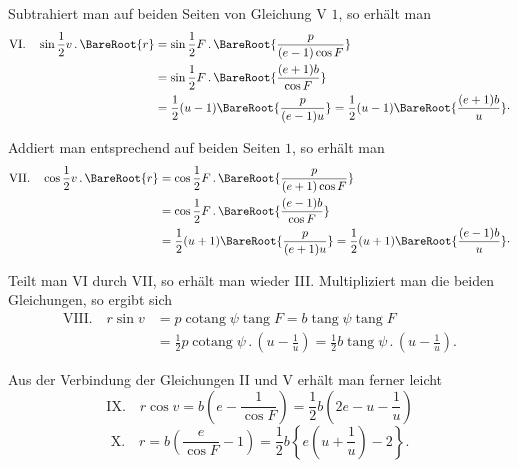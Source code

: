 Subtrahiert man auf beiden Seiten von Gleichung V $1$, so erhält man
\[
\begin{aligned}
\mathrm{VI.}\quad\sin\frac{1}{2}v\, .\,\BareRoot{r}&=\sin\frac{1}{2}F\, .\,\BareRoot{\frac{p}{(e-1)\cos F}}\\
&=\sin\frac{1}{2}F\, .\,\BareRoot{\frac{(e+1)b}{\cos F}}\\
&=\frac{1}{2}(u-1)\BareRoot{\frac{p}{(e-1)u}}=\frac{1}{2}(u-1)\BareRoot{\frac{(e+1)b}{u}}\cdot
\end{aligned}
\]

Addiert man entsprechend auf beiden Seiten $1$, so erhält man
\[
\begin{aligned}
\mathrm{VII.}\quad\cos\frac{1}{2}v\, .\,\BareRoot{r}&=\cos\frac{1}{2}F\, .\,\BareRoot{\frac{p}{(e+1)\cos F}}\\
&=\cos\frac{1}{2}F\, .\,\BareRoot{\frac{(e-1)b}{\cos F}}\\
&=\frac{1}{2}(u+1)\BareRoot{\frac{p}{(e+1)u}}=\frac{1}{2}(u+1)\BareRoot{\frac{(e-1)b}{u}}\cdot
\end{aligned}
\]

Teilt man VI durch VII, so erhält man wieder III. Multipliziert man die beiden Gleichungen, so ergibt sich
\[
\begin{aligned}
\mathrm{VIII.}\quad r\sin v&=p\operatorname{cotang}\psi\operatorname{tang}F=b\operatorname{tang}\psi\operatorname{tang}F\\
&=\frac{1}{2}p\operatorname{cotang}\psi\, .\,\left(u-\frac{1}{u}\right)=\frac{1}{2}b\operatorname{tang}\psi\, .\,\left(u-\frac{1}{u}\right).
\end{aligned}
\]

Aus der Verbindung der Gleichungen II und V erhält man ferner leicht
\[
\mathrm{IX.}\quad r\cos v=b\left(e-\frac{1}{\cos F}\right)=\frac{1}{2}b\left(2e-u-\frac{1}{u}\right)
\]
\[
\mathrm{X.}\quad r=b\left(\frac{e}{\cos F}-1\right)=\frac{1}{2}b\left\{e\left(u+\frac{1}{u}\right)-2\right\}.
\]
